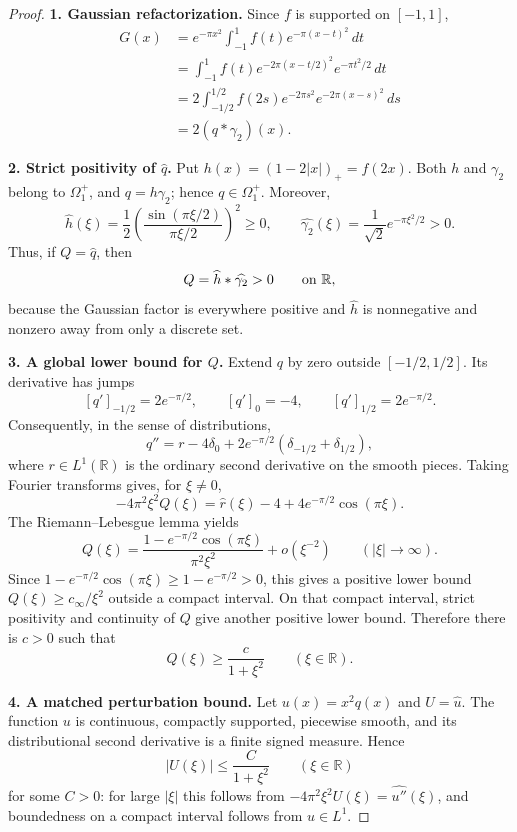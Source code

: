 \documentclass[11pt]{article}
\newcommand{\R}{\mathbb{R}}
\newcommand{\Om}{\Omega_1^+}
\begin{document}
\begin{proof}
\textbf{1. Gaussian refactorization.}
Since $f$ is supported on $[-1,1]$,
\begin{align*}
 G(x)
 &=e^{-\pi x^2}\int_{-1}^{1}f(t)e^{-\pi(x-t)^2}\,dt\\
 &=\int_{-1}^{1}f(t)e^{-2\pi(x-t/2)^2}e^{-\pi t^2/2}\,dt\\
 &=2\int_{-1/2}^{1/2}f(2s)e^{-2\pi s^2}e^{-2\pi(x-s)^2}\,ds\\
 &=2(q*\gamma_2)(x).
\end{align*}

\textbf{2. Strict positivity of $\widehat q$.}
Put $h(x)=(1-2|x|)_+=f(2x)$.  Both $h$ and $\gamma_2$ belong to $\Om$,
and $q=h\gamma_2$; hence $q\in\Om$.  Moreover,
\[
 \widehat h(\xi)
 =\frac12\left(\frac{\sin(\pi\xi/2)}{\pi\xi/2}\right)^2\geq0,
 \qquad
 \widehat{\gamma_2}(\xi)=\frac1{\sqrt2}e^{-\pi\xi^2/2}>0.
\]
Thus, if $Q=\widehat q$, then
\[
 Q=\widehat h*\widehat{\gamma_2}>0
 \qquad\hbox{on }\R,
\]
because the Gaussian factor is everywhere positive and $\widehat h$ is
nonnegative and nonzero away from only a discrete set.

\textbf{3. A global lower bound for $Q$.}
Extend $q$ by zero outside $[-1/2,1/2]$.  Its derivative has jumps
\[
 [q']_{-1/2}=2e^{-\pi/2},
 \qquad [q']_0=-4,
 \qquad [q']_{1/2}=2e^{-\pi/2}.
\]
Consequently, in the sense of distributions,
\[
 q''=r-4\delta_0
       +2e^{-\pi/2}(\delta_{-1/2}+\delta_{1/2}),
\]
where $r\in L^1(\R)$ is the ordinary second derivative on the smooth
pieces.  Taking Fourier transforms gives, for $\xi\ne0$,
\[
 -4\pi^2\xi^2Q(\xi)
 =\widehat r(\xi)-4+4e^{-\pi/2}\cos(\pi\xi).
\]
The Riemann--Lebesgue lemma yields
\[
 Q(\xi)
 =\frac{1-e^{-\pi/2}\cos(\pi\xi)}{\pi^2\xi^2}
  +o(\xi^{-2})
 \qquad (|\xi|\to\infty).
\]
Since $1-e^{-\pi/2}\cos(\pi\xi)\geq1-e^{-\pi/2}>0$, this gives a
positive lower bound $Q(\xi)\geq c_\infty/\xi^2$ outside a compact
interval.  On that compact interval, strict positivity and continuity of
$Q$ give another positive lower bound.  Therefore there is $c>0$ such that
\begin{equation}
 Q(\xi)\geq\frac{c}{1+\xi^2}
 \qquad(\xi\in\R).
 \tag{1}
\end{equation}

\textbf{4. A matched perturbation bound.}
Let $u(x)=x^2q(x)$ and $U=\widehat u$.  The function $u$ is continuous,
compactly supported, piecewise smooth, and its distributional second
derivative is a finite signed measure.  Hence
\[
 |U(\xi)|\leq\frac{C}{1+\xi^2}
 \qquad(\xi\in\R)
 \tag{2}
\]
for some $C>0$: for large $|\xi|$ this follows from
$-4\pi^2\xi^2U(\xi)=\widehat{u''}(\xi)$, and boundedness on a compact
interval follows from $u\in L^1$.


\end{proof}
\end{document}
